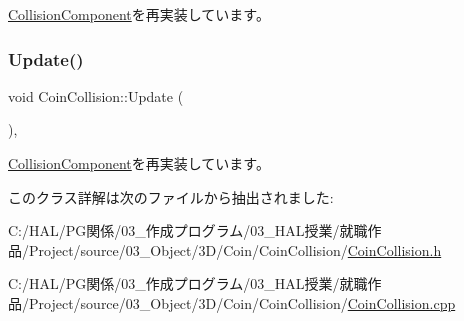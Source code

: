 \mbox{\hyperlink{class_collision_component_aa75440061f7a60e8c4ee1dae18682cc0}{Collision\+Component}}を再実装しています。

\mbox{\label{class_coin_collision_a981fd9b1b8c688a757a456a56d80501b}} 
\subsubsection{\texorpdfstring{Update()}{Update()}}
{\footnotesize\ttfamily void Coin\+Collision\+::\+Update (\begin{DoxyParamCaption}{ }\end{DoxyParamCaption})\hspace{0.3cm}{\ttfamily [override]}, {\ttfamily [virtual]}}



\mbox{\hyperlink{class_collision_component_a3fa60fd8b4e8690f783c0f578949664e}{Collision\+Component}}を再実装しています。



このクラス詳解は次のファイルから抽出されました\+:\begin{DoxyCompactItemize}
\item 
C\+:/\+H\+A\+L/\+P\+G関係/03\+\_\+作成プログラム/03\+\_\+\+H\+A\+L授業/就職作品/\+Project/source/03\+\_\+\+Object/3\+D/\+Coin/\+Coin\+Collision/\mbox{\hyperlink{_coin_collision_8h}{Coin\+Collision.\+h}}\item 
C\+:/\+H\+A\+L/\+P\+G関係/03\+\_\+作成プログラム/03\+\_\+\+H\+A\+L授業/就職作品/\+Project/source/03\+\_\+\+Object/3\+D/\+Coin/\+Coin\+Collision/\mbox{\hyperlink{_coin_collision_8cpp}{Coin\+Collision.\+cpp}}\end{DoxyCompactItemize}
